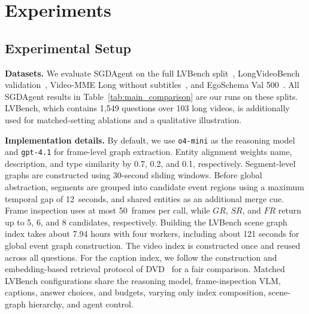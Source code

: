 \documentclass[11pt]{article}
\begin{document}
\section{Experiments}
\label{sec:experiments}


\subsection{Experimental Setup}
\label{sec:setup}

\textbf{Datasets.}
We evaluate SGDAgent on the full LVBench split~\cite{lvbench}, LongVideoBench validation~\cite{longvideobench2024}, Video-MME Long without subtitles~\cite{videomme2024}, and EgoSchema Val 500~\cite{egoschema2023}.
All SGDAgent results in Table~\ref{tab:main_comparison} are our runs on these splits.
LVBench, which contains 1{,}549 questions over 103 long videos, is additionally used for matched-setting ablations and a qualitative illustration.



\textbf{Implementation details.}
By default, we use \texttt{o4-mini} as the reasoning model and \texttt{gpt-4.1} for frame-level graph extraction.
Entity alignment weights name, description, and type similarity by 0.7, 0.2, and 0.1, respectively.
Segment-level graphs are constructed using 30-second sliding windows. Before global abstraction, segments are grouped into candidate event regions using a maximum temporal gap of 12~seconds, and shared entities as an additional merge cue.
Frame inspection uses at most 50~frames per call, while $GR$, $SR$, and $FR$ return up to 5, 6, and 8 candidates, respectively.
Building the LVBench scene graph index takes about 7.94 hours with four workers, including about 121 seconds for global event graph construction.
The video index is constructed once and reused across all questions.
For the caption index, we follow the construction and embedding-based retrieval protocol of DVD~\cite{deepvideo2025} for a fair comparison.
Matched LVBench configurations share the reasoning model, frame-inspection VLM, captions, answer choices, and budgets, varying only index composition, scene-graph hierarchy, and agent control.
\end{document}
